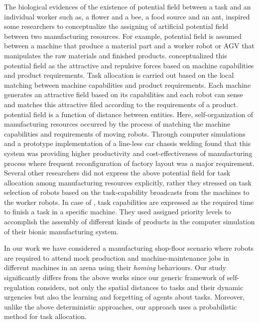 \documentclass[smallcondensed]{svjour3}
\begin{document}
The biological evidences of the existence of potential field between a task and an individual worker such as, a flower and a bee, a food source and an ant, inspired some researchers to conceptualize the assigning of artificial potential field between two manufacturing resources. For example, potential field is assumed between a machine that produce a material part and a worker robot or AGV that manipulates the raw materials and finished products. \cite{Ueda2006} conceptualized this potential field as the attractive and repulsive forces based on machine capabilities and product requirements. Task allocation is carried out based on the local matching between machine capabilities and product requirements. Each machine generates an attractive field based on its capabilities and each robot can sense and matches this attractive filed according to the requirements of a product. potential field is a function of distance between entities. Here, self-organization of manufacturing resources occurred by the process of matching the machine capabilities and requirements of moving robots. Through computer simulations and a prototype implementation of a line-less car chassis welding \cite{Ueda2006} found that this system was providing higher productivity and cost-effectiveness of manufacturing process where frequent reconfiguration of factory layout was a major requirement. Several other researchers did not express the above potential field for task allocation among manufacturing resources explicitly, rather they stressed on task selection of robots based on the task-capability broadcasts from the machines to the worker robots. In case of \cite{Lazinica+2007}, task capabilities are expressed as the required time to finish a task in a specific machine. They used assigned priority levels to accomplish the assembly of different kinds of products in the computer simulation of their bionic manufacturing system. 

In our work we have considered a manufacturing shop-floor scenario where robots are required to attend mock production and machine-maintenance jobs in different machines in an arena using their {\em homing} behaviours. Our study significantly differs from the above works since our generic framework of self-regulation considers, not only the spatial distances to tasks and their dynamic urgencies but also the learning and forgetting of agents about tasks. Moreover, unlike the above deterministic approaches, our approach uses a probabilistic method for task allocation.
\end{document}
